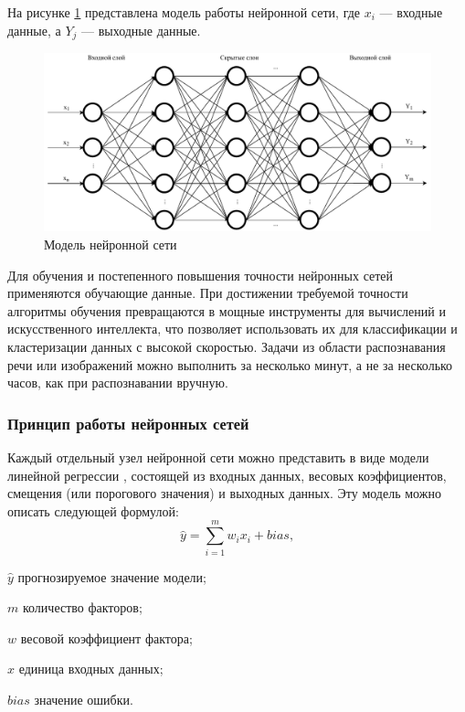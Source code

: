 На рисунке \ref{fig:neuralnet} представлена модель работы нейронной сети, где $x_i$ --- входные данные, а $Y_j$ --- выходные данные.

\begin{figure}[H]
	\centering
	\includegraphics[width=\textwidth]{img/neuralnet.pdf}
	\caption{Модель нейронной сети}
	\label{fig:neuralnet}
\end{figure}

Для обучения и постепенного повышения точности нейронных сетей применяются обучающие данные. При достижении требуемой точности алгоритмы обучения превращаются в мощные инструменты для вычислений и искусственного интеллекта, что позволяет использовать их для классификации и кластеризации данных с высокой скоростью. Задачи из области распознавания речи или изображений можно выполнить за несколько минут, а не за несколько часов, как при распознавании вручную.

\subsubsection{Принцип работы нейронных сетей}

Каждый отдельный узел нейронной сети можно представить в виде модели линейной регрессии \cite{linearreg}, состоящей из входных данных, весовых коэффициентов, смещения (или порогового значения) и выходных данных. Эту модель можно описать следующей формулой:
\begin{equation}
	\label{eq:nn0}
	\hat{y} = \sum_{i=1}^{m}w_ix_i + bias,
\end{equation}
\begin{eqexpl}[15mm]
\item{$\hat{y}$} прогнозируемое значение модели;
\item{$m$} количество факторов;
\item{$w$} весовой коэффициент фактора;
\item{$x$} единица входных данных;
\item{$bias$} значение ошибки.
\end{eqexpl}

